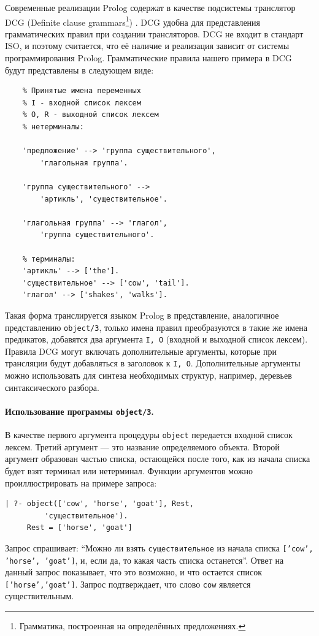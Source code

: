 \documentclass[12pt, openany, twoside]{book} %
\begin{document}
Современные реализации Prolog содержат в качестве подсистемы транслятор DCG (Definite clause grammars\footnote{Грамматика, построенная на определённых предложениях.}) \cite{WIKI-DCG}.  DCG удобна для представления грамматических правил при создании трансляторов. DCG не входит в стандарт ISO, и поэтому считается, что её наличие и реализация зависит от системы программирования Prolog. Грамматические правила нашего примера в DCG будут представлены в следующем виде:
{\tt\begin{verbatim}
    % Принятые имена переменных
    % I - входной список лексем
    % О, R - выходной список лексем
    % нетерминалы:

    'предложение' --> 'группа существительного',
        'глагольная группа'.

    'группа существительного' -->
        'артикль', 'существительное'.

    'глагольная группа' --> 'глагол',
        'группа существительного'.

    % терминалы:
    'артикль' --> ['the'].
    'существительное' --> ['cow', 'tail'].
    'глагол' --> ['shakes', 'walks'].
\end{verbatim}}
\noindent{} Такая форма транслируется языком Prolog в представление, аналогичное представлению \texttt{object/3}, только имена правил преобразуются в такие же имена предикатов, добавятся два аргумента \texttt{I, O} (входной и выходной список лексем). Правила DCG могут включать дополнительные аргументы, которые при трансляции будут добавляться в заголовок к \texttt{I, O}. Дополнительные аргументы можно использовать для синтеза необходимых структур, например, деревьев синтаксического разбора.

\paragraph{Использование программы {\tt object/3}.} В качестве первого аргумента процедуры {\tt object} передается входной список лексем. Третий аргумент --- это название определяемого объекта. Второй аргумент образован частью списка, остающейся после того, как из начала списка будет взят терминал или нетерминал. Функции аргументов можно проиллюстрировать на примере запроса:

{\tt\begin{verbatim}
| ?- object(['cow', 'horse', 'goat'], Rest,
         'существительное').
     Rest = ['horse', 'goat']
\end{verbatim}}

Запрос спрашивает: ``Можно ли взять {\tt существительное} из начала списка {\tt ['cow', 'horse', 'goat']}, и, если да, то какая часть списка останется''. Ответ на данный запрос показывает, что это возможно, и что остается список {\tt ['horse','goat']}. Запрос подтверждает, что слово {\tt cow} является существительным.
\end{document}

